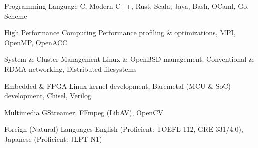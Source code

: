 

\begin{cvskills}

  \cvskill
    {Programming Language} %
    {C, Modern C++, Rust, Scala, Java, Bash, OCaml, Go, Scheme} %

  \cvskill
    {High Performance Computing} %
    {Performance profiling \& optimizations, MPI, OpenMP, OpenACC} %

  \cvskill
    {System \& Cluster Management} %
    {Linux \& OpenBSD management, Conventional \& RDMA networking, Distributed filesystems} %

  \cvskill
    {Embedded \& FPGA}
    {Linux kernel development, Baremetal (MCU \& SoC) development, Chisel, Verilog}

  \cvskill
    {Multimedia}
    {GStreamer, FFmpeg (LibAV), OpenCV}

  \cvskill
    {Foreign (Natural) Languages} %
    {English (Proficient: TOEFL 112, GRE 331/4.0), Japanese (Proficient: JLPT N1)} %

\end{cvskills}
